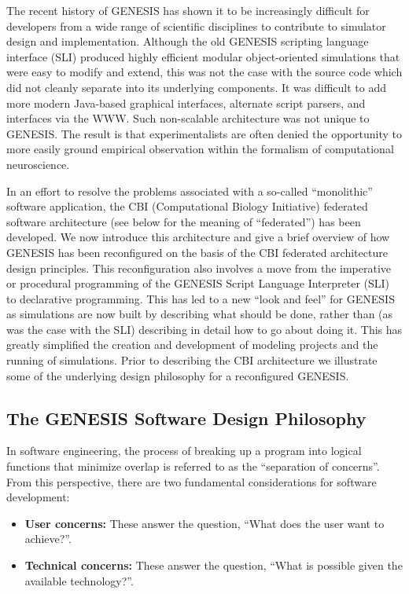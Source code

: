 \documentclass[12pt]{article}
\begin{document}
The recent history of GENESIS has shown it to be increasingly difficult for developers from a wide range of scientific disciplines to contribute to simulator design and implementation. Although the old GENESIS scripting language interface (SLI) produced highly efficient modular object-oriented simulations that were easy to modify and extend, this was not the case with the source code which did not cleanly separate into its underlying components. It was difficult to add more modern Java-based graphical interfaces, alternate script parsers, and interfaces via the WWW. Such non-scalable architecture was not unique to GENESIS. The result is that experimentalists are often denied the opportunity to more easily ground empirical observation within the formalism of computational neuroscience.

In an effort to resolve the problems associated with a so-called ``monolithic'' software application, the CBI (Computational Biology Initiative) federated software architecture (see below for the meaning of ``federated'') has been developed. We now introduce this architecture and give a brief overview of how GENESIS has been reconfigured on the basis of the CBI federated architecture design principles. This reconfiguration also involves a move from the imperative or procedural programming of the GENESIS Script Language Interpreter (SLI) to declarative programming. This has led to a new ``look and feel'' for GENESIS as simulations are now built by describing what should be done, rather than (as was the case with the SLI) describing in detail how to go about doing it. This has greatly simplified the creation and development of modeling projects and the running of simulations. Prior to describing the CBI architecture we illustrate some of the underlying design philosophy for a reconfigured GENESIS.

\subsection*{The GENESIS Software Design Philosophy}
In software engineering, the process of breaking up a program into logical functions that minimize overlap is referred to as the ``separation of concerns''.  From this perspective, there are two fundamental considerations for software development:

\begin{itemize}
\item {\bf User concerns:} These answer the question, ``What does the user want to achieve?''.
\item {\bf Technical concerns:} These answer the question, ``What is possible given the available technology?''.
\end{itemize}
\end{document}
